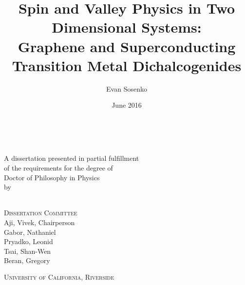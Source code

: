\title{Spin and Valley Physics in Two Dimensional Systems: \\%
  Graphene and Superconducting Transition Metal Dichalcogenides}
\author{Evan Sosenko}
\date{June 2016}

\newcommand{\thedegree}{Doctor of Philosophy}
\newcommand{\thefield}{Physics}
\newcommand{\theuniversity}{University of California, Riverside}
\newcommand{\thecommittee}{%
  Aji, Vivek, Chairperson \\
  Gabor, Nathaniel \\
  Pryadko, Leonid \\
  Tsai, Shan-Wen \\
  Beran, Gregory
}

\clearpage
\thispagestyle{empty}
\centering
\vspace*{-\toptafiddle}

\textsc{\thetitle} \\

\vfill

A dissertation presented in partial fulfillment \\
of the requirements for the degree of \\
\thedegree{} in \thefield{} \\
by \\
\theauthor{} \\
\thedate{}

\vfill

\textsc{Dissertation Committee} \\
\thecommittee{}

\vfill

\textsc{\theuniversity}

\enlargethispage{\bottafiddle}
\clearpage
